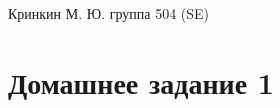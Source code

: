 \documentclass[a4paper,12pt]{article}
\begin{document}
\sloppy

\lstset{
	basicstyle=\small,
	stringstyle=\ttfamily,
	showstringspaces=false,
	columns=fixed,
	breaklines=true,
	numbers=right,
	numberstyle=\tiny
}

\newtheorem{Def}{Определение}[section]
\newtheorem{Th}{Теорема}
\newtheorem{Lem}[Th]{Лемма}
\newenvironment{Proof}
	{\par\noindent{\bf Доказательство.}}
	{\hfill$\scriptstyle\blacksquare$}
\newenvironment{Solution}
	{\par\noindent{\bf Решение.}}
	{\hfill$\scriptstyle\blacksquare$}


\begin{flushright}
	Кринкин М. Ю. группа 504 (SE)
\end{flushright}

\section{Домашнее задание 1}
\end{document}
